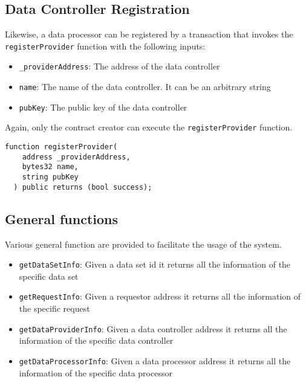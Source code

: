 \subsection{Data Controller Registration}
\label{implemenation:contracts:reg_processor}

Likewise, a data processor can be registered by a transaction that invokes the \verb|registerProvider| function with the following inputs:

\begin{itemize}
  \item \verb|_providerAddress|: The address of the data controller
  \item \verb|name|: The name of the data controller. It can be an arbitrary string
  \item \verb|pubKey|: The public key of the data controller
\end{itemize}

Again, only the contract creator can execute the \verb|registerProvider| function.

\begin{lstlisting}[language=Solidity, caption={Data controller registration function}]
  function registerProvider(
    address _providerAddress,
    bytes32 name,
    string pubKey
  ) public returns (bool success);
\end{lstlisting}

\subsection{General functions}
\label{implemenation:contracts:general}

Various general function are provided to facilitate the usage of the system.

\begin{itemize}
  \item \verb|getDataSetInfo|: Given a data set id it returns all the information of the specific data set
  \item \verb|getRequestInfo|: Given a requestor address it returns all the information of the specific request
  \item \verb|getDataProviderInfo|: Given a data controller address it returns all the information of the specific data controller
  \item \verb|getDataProcessorInfo|: Given a data processor address it returns all the information of the specific data processor
\end{itemize}

